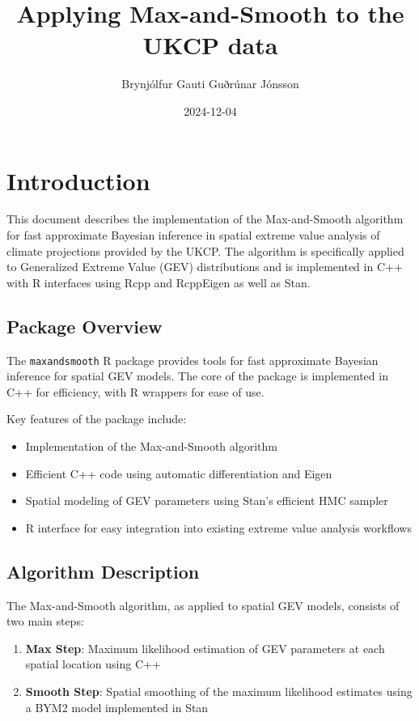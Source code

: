 \documentclass[
  letterpaper,
  DIV=11,
  numbers=noendperiod]{scrartcl}
\title{Applying Max-and-Smooth to the UKCP data}
\author{Brynjólfur Gauti Guðrúnar Jónsson}
\date{2024-12-04}
\providecommand{\tightlist}{%
  \setlength{\itemsep}{0pt}\setlength{\parskip}{0pt}}\usepackage{longtable,booktabs,array}
\begin{document}
\maketitle


\section{Introduction}\label{introduction}

This document describes the implementation of the Max-and-Smooth
algorithm for fast approximate Bayesian inference in spatial extreme
value analysis of climate projections provided by the UKCP. The
algorithm is specifically applied to Generalized Extreme Value (GEV)
distributions and is implemented in C++ with R interfaces using Rcpp and
RcppEigen as well as Stan.

\subsection{Package Overview}\label{package-overview}

The \texttt{maxandsmooth} R package provides tools for fast approximate
Bayesian inference for spatial GEV models. The core of the package is
implemented in C++ for efficiency, with R wrappers for ease of use.

Key features of the package include:

\begin{itemize}
\tightlist
\item
  Implementation of the Max-and-Smooth algorithm
\item
  Efficient C++ code using automatic differentiation and Eigen
\item
  Spatial modeling of GEV parameters using Stan's efficient HMC sampler
\item
  R interface for easy integration into existing extreme value analysis
  workflows
\end{itemize}

\subsection{Algorithm Description}\label{algorithm-description}

The Max-and-Smooth algorithm, as applied to spatial GEV models, consists
of two main steps:

\begin{enumerate}
\def\labelenumi{\arabic{enumi}.}
\tightlist
\item
  \textbf{Max Step}: Maximum likelihood estimation of GEV parameters at
  each spatial location using C++
\item
  \textbf{Smooth Step}: Spatial smoothing of the maximum likelihood
  estimates using a BYM2 model implemented in Stan
\end{enumerate}
\end{document}
